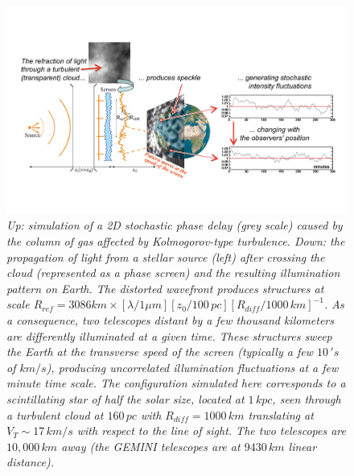 \documentclass[11pt]{article}
\begin{document}
\begin{figure}[h]
\begin{center}
\includegraphics[angle=0,scale=.50]{principe_scintillation_2tels.pdf}
\end{center}
\caption
{\it
Up: simulation of a 2D stochastic phase delay (grey scale) caused by the
column of gas affected by Kolmogorov-type turbulence.
Down: the propagation of light from a stellar source (left)
after crossing the cloud (represented as a phase screen)
and the resulting illumination pattern
on Earth. The distorted wavefront produces structures at scale
$R_{ref}= 3086km\times
\left[\lambda/1\mu m \right]\left[z_0/100\,
    pc\right]\left[R_{diff}/1000\, km\right]^{-1}$.
As a consequence, two telescopes distant by a few thousand kilometers
are differently illuminated at a given time.
These structures sweep the Earth at the transverse speed
of the screen (typically a few $10\, 's$ of $km/s$), producing uncorrelated
illumination fluctuations at a few minute time scale.
The configuration simulated here corresponds to a scintillating star of half the solar size,
located at $1\, kpc$, seen through a turbulent cloud at $160\, pc$ with $R_{diff}=1000\, km$
translating at $V_T \sim 17\, km/s$ with respect to the line of sight. The two telescopes are
$10,000\, km$ away (the GEMINI telescopes are at $9430\, km$ linear distance).
}
\label{principe}
\end{figure}
\end{document}
